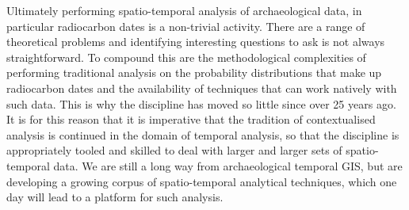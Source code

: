 Ultimately performing spatio-temporal analysis of archaeological data, in particular radiocarbon dates is a non-trivial activity. There are a range of theoretical problems and identifying interesting questions to ask is not always straightforward. To compound this are the methodological complexities of performing traditional analysis on the probability distributions that make up radiocarbon dates and the availability of techniques that can work natively with such data. This is why the discipline has moved so little since \citet{Castleford:1992fk} over 25 years ago. It is for this reason that it is imperative that the tradition of contextualised analysis is continued in the domain of temporal analysis, so that the discipline is appropriately tooled and skilled to deal with larger and larger sets of spatio-temporal data. We are still a long way from archaeological temporal GIS, but are developing a growing corpus of spatio-temporal analytical techniques, which one day will lead to a platform for such analysis.